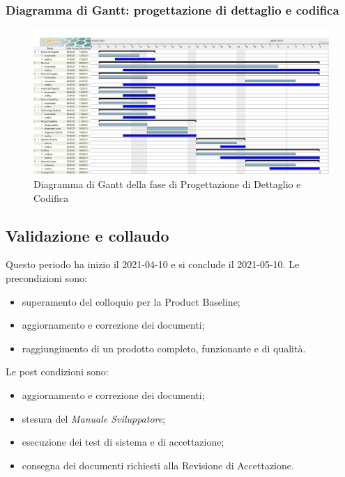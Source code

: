 \subsubsection{Diagramma di Gantt: progettazione di dettaglio e codifica}
\begin{figure}[H]
    \centering
    \includegraphics[scale = 0.25]{components/img/progettazione_dettaglio_codifica.jpg}
    \caption{Diagramma di Gantt della fase di Progettazione di Dettaglio e Codifica}
    \label{fig:Diagramma di Gantt, fase di Progettazione di dettaglio e codifica}
\end{figure}

\newpage
\subsection{Validazione e collaudo}
Questo periodo ha inizio il 2021-04-10 e si conclude il 2021-05-10.
Le precondizioni sono:
\begin{itemize}
	\item superamento del colloquio per la Product Baseline;
	\item aggiornamento e correzione dei documenti;
	\item raggiungimento di un prodotto completo, funzionante e di qualità.
\end{itemize}
Le post condizioni sono:
\begin{itemize}
	\item aggiornamento e correzione dei documenti;
	\item stesura del \textit{Manuale Sviluppatore};
	\item esecuzione dei test di sistema e di accettazione;
	\item consegna dei documenti richiesti alla Revisione di Accettazione.
\end{itemize}
